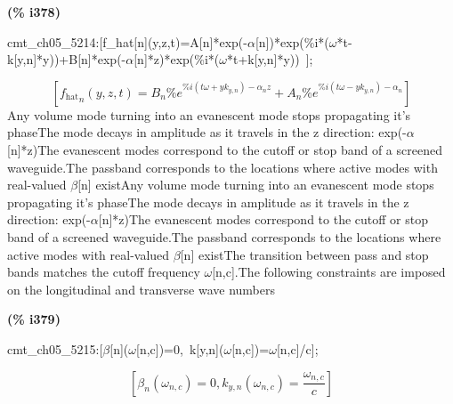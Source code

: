 \documentclass[fleqn]{article}
\begin{document}
\noindent
\begin{minipage}[t]{4.000000em}\color{red}\bfseries
(\% i378)	
\end{minipage}
\begin{minipage}[t]{\textwidth}\color{blue}
cmt\_ch05\_5214:[f\_hat[n](y,z,t)=A[n]*exp(-\ensuremath{\alpha}[n])*exp(\%i*(\ensuremath{\omega}*t-k[y,n]*y))+B[n]*exp(-\ensuremath{\alpha}[n]*z)*exp(\%i*(\ensuremath{\omega}*t+k[y,n]*y))\ ];
\end{minipage}
\[\displaystyle \tag{\% o378} 
\left[ {{{f_{\ensuremath{\mathrm{hat}}}}}_n}\left( y\operatorname{,}z\operatorname{,}t\right) ={B_n} {{\% e}^{\% i \left( t \omega +y {k_{y,n}}\right) -{{\alpha }_n} z}}+{A_n} {{\% e}^{\% i \left( t \omega -y {k_{y,n}}\right) -{{\alpha }_n}}}\right] \mbox{}
\]
Any volume mode turning into an evanescent mode stops propagating it's phaseThe mode decays in amplitude as it travels in the z direction: exp(-\ensuremath{\alpha}[n]*z)The evanescent modes correspond to the cutoff or stop band of a screened waveguide.The passband corresponds to the locations where active modes with real-valued \ensuremath{\beta}[n] existAny volume mode turning into an evanescent mode stops propagating it's phaseThe mode decays in amplitude as it travels in the z direction: exp(-\ensuremath{\alpha}[n]*z)The evanescent modes correspond to the cutoff or stop band of a screened waveguide.The passband corresponds to the locations where active modes with real-valued \ensuremath{\beta}[n] existThe transition between pass and stop bands matches the cutoff frequency \ensuremath{\omega}[n,c].The following constraints are imposed on the longitudinal and transverse wave numbers


\noindent
\begin{minipage}[t]{4.000000em}\color{red}\bfseries
(\% i379)	
\end{minipage}
\begin{minipage}[t]{\textwidth}\color{blue}
cmt\_ch05\_5215:[\ensuremath{\beta}[n](\ensuremath{\omega}[n,c])=0,\ k[y,n](\ensuremath{\omega}[n,c])=\ensuremath{\omega}[n,c]/c];
\end{minipage}
\[\displaystyle \tag{\% o379} 
\left[ {{\beta }_n}\left( {{\omega }_{n,c}}\right) =0\operatorname{,}{k_{y,n}}\left( {{\omega }_{n,c}}\right) =\frac{{{\omega }_{n,c}}}{c}\right] \mbox{}
\]
\end{document}
